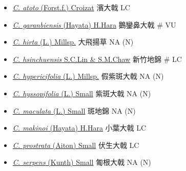 \begin{itemize}
  \begin{itemize}
        \item[] \href{http://www.theplantlist.org/tpl1.1/search?q=Chamaesyce+atoto}{\textit{C. atoto} (Forst.f.) Croizat}   濱大戟   LC
        \item[] \href{http://www.theplantlist.org/tpl1.1/search?q=Chamaesyce+garanbiensis}{\textit{C. garanbiensis} (Hayata) H.Hara}   鵝鑾鼻大戟  \# VU
        \item[] \href{http://www.theplantlist.org/tpl1.1/search?q=Chamaesyce+hirta}{\textit{C. hirta} (L.) Millsp.}   大飛揚草   NA (N)
        \item[] \href{http://www.theplantlist.org/tpl1.1/search?q=Chamaesyce+hsinchuensis}{\textit{C. hsinchuensis} S.C.Lin \& S.M.Chaw}   新竹地錦  \# LC
        \item[] \href{http://www.theplantlist.org/tpl1.1/search?q=Chamaesyce+hypericifolia}{\textit{C. hypericifolia} (L.) Millsp.}   假紫斑大戟   NA (N)
        \item[] \href{http://www.theplantlist.org/tpl1.1/search?q=Chamaesyce+hyssopifolia}{\textit{C. hyssopifolia} (L.) Small}   紫斑大戟   NA (N)
        \item[] \href{http://www.theplantlist.org/tpl1.1/search?q=Chamaesyce+maculata}{\textit{C. maculata} (L.) Small}   斑地錦   NA (N)
        \item[] \href{http://www.theplantlist.org/tpl1.1/search?q=Chamaesyce+makinoi}{\textit{C. makinoi} (Hayata) H.Hara}   小葉大戟   LC
        \item[] \href{http://www.theplantlist.org/tpl1.1/search?q=Chamaesyce+prostrata}{\textit{C. prostrata} (Aiton) Small}   伏生大戟   LC
        \item[] \href{http://www.theplantlist.org/tpl1.1/search?q=Chamaesyce+serpens}{\textit{C. serpens} (Kunth) Small}   匍根大戟   NA (N)

\end{itemize}
\end{itemize}
